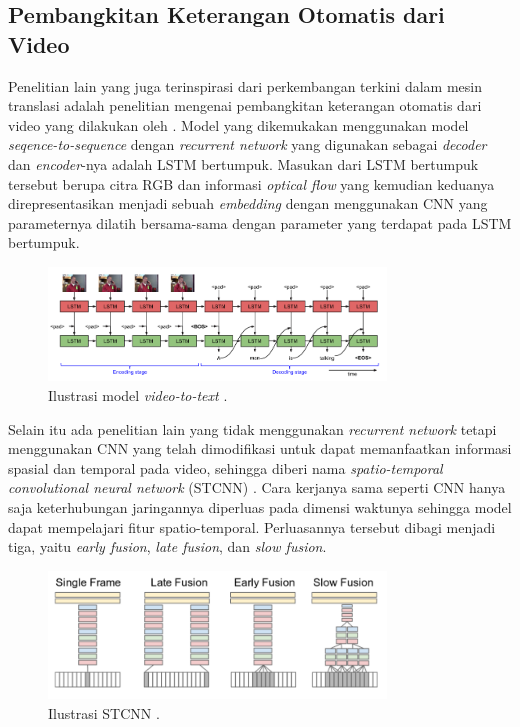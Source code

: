 \subsection{Pembangkitan Keterangan Otomatis dari Video}

Penelitian lain yang juga terinspirasi dari perkembangan terkini dalam mesin translasi adalah penelitian mengenai pembangkitan keterangan otomatis dari video yang dilakukan oleh \textcite{Venugopalan2015}. Model yang dikemukakan menggunakan model \textit{seqence-to-sequence} dengan \textit{recurrent network} yang digunakan sebagai \textit{decoder} dan \textit{encoder}-nya adalah LSTM bertumpuk. Masukan dari LSTM bertumpuk tersebut berupa citra RGB dan informasi \textit{optical flow} yang kemudian keduanya direpresentasikan menjadi sebuah \textit{embedding} dengan menggunakan CNN yang parameternya dilatih bersama-sama dengan parameter yang terdapat pada LSTM bertumpuk.
\bigskip

\begin{figure}[h]
    \centering
    \includegraphics[width=0.8\textwidth]{resources/images/video-to-text.png}
    \caption{Ilustrasi model \textit{video-to-text} \parencite{Chung2017}.}
    \label{fig:video-to-text}
\end{figure}

Selain itu ada penelitian lain yang tidak menggunakan \textit{recurrent network} tetapi menggunakan CNN yang telah dimodifikasi untuk dapat memanfaatkan informasi spasial dan temporal pada video, sehingga diberi nama \textit{spatio-temporal convolutional neural network} (STCNN) \parencite{Karpathy2014}. Cara kerjanya sama seperti CNN hanya saja keterhubungan jaringannya diperluas pada dimensi waktunya sehingga model dapat mempelajari fitur spatio-temporal. Perluasannya tersebut dibagi menjadi tiga, yaitu \textit{early fusion}, \textit{late fusion}, dan \textit{slow fusion}.

\begin{figure}[h]
    \centering
    \includegraphics[width=0.8\textwidth]{resources/images/stcnn.png}
    \caption{Ilustrasi STCNN \parencite{Karpathy2014}.}
    \label{fig:stcnn}
\end{figure}

